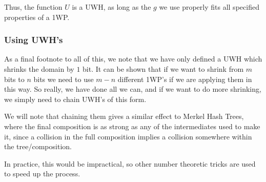 \documentclass[11pt]{article}
\begin{document}
Thus, the function \(U\) is a UWH, as long as the \(g\) we use properly fits all specified properties of a 1WP.\bigskip


\subsubsection{Using UWH's}
As a final footnote to all of this, we note that we have only defined a UWH which shrinks the domain by \(1\) bit. It can be shown that if we want to shrink from \(m\) bits to \(n\) bits we need to use \(m-n\) different 1WP's if we are applying them in this way. So really, we have done all we can, and if we want to do more shrinking, we simply need to chain UWH's of this form.\smallskip

We will note that chaining them gives a similar effect to Merkel Hash Trees, where the final composition is as strong as any of the intermediates used to make it, since a collision in the full composition implies a collision somewhere within the tree/composition.\smallskip

In practice, this would be impractical, so other number theoretic tricks are used to speed up the process.
\end{document}
